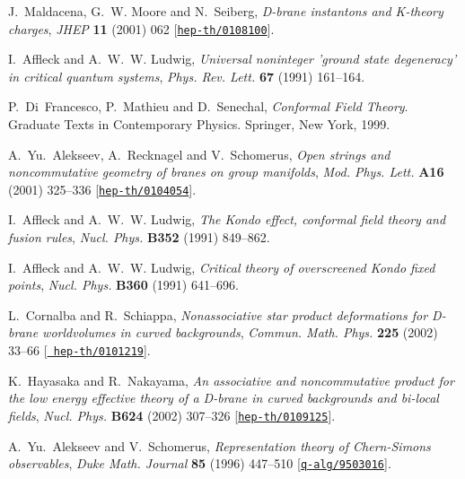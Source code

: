 \documentclass[12pt,a4paper]{article}
\begin{document}
\begin{thebibliography}{10}
J.~Maldacena, G.~W. Moore and N.~Seiberg, {\it D-brane instantons and
  {K-theory} charges},  {\em JHEP} {\bf 11} (2001) 062
  [\href{http://arXiv.org/abs/hep-th/0108100}{{\tt hep-th/0108100}}].

I.~Affleck and A.~W.~W. Ludwig, {\it Universal noninteger 'ground state
  degeneracy' in critical quantum systems},  {\em Phys. Rev. Lett.} {\bf 67}
  (1991) 161--164.

P.~Di~Francesco, P.~Mathieu and D.~Senechal, {\em {Conformal Field Theory}}.
\newblock Graduate Texts in Contemporary Physics. Springer, New York, 1999.

A.~Yu.~Alekseev, A.~Recknagel and V.~Schomerus, {\it Open strings and
  noncommutative geometry of branes on group manifolds},  {\em Mod. Phys.
  Lett.} {\bf A16} (2001) 325--336
  [\href{http://arXiv.org/abs/hep-th/0104054}{{\tt hep-th/0104054}}].

I.~Affleck and A.~W.~W. Ludwig, {\it The {Kondo} effect, conformal field theory
  and fusion rules},  {\em Nucl. Phys.} {\bf B352} (1991) 849--862.

I.~Affleck and A.~W.~W. Ludwig, {\it Critical theory of overscreened {Kondo}
  fixed points},  {\em Nucl. Phys.} {\bf B360} (1991) 641--696.

L.~Cornalba and R.~Schiappa, {\it Nonassociative star product deformations for
  {D-brane} worldvolumes in curved backgrounds},  {\em Commun. Math. Phys.}
  {\bf 225} (2002) 33--66 [\href{http://arXiv.org/abs/hep-th/0101219}{{\tt
  hep-th/0101219}}].

K.~Hayasaka and R.~Nakayama, {\it An associative and noncommutative product for
  the low energy effective theory of a {D-brane} in curved backgrounds and
  bi-local fields},  {\em Nucl. Phys.} {\bf B624} (2002) 307--326
  [\href{http://arXiv.org/abs/hep-th/0109125}{{\tt hep-th/0109125}}].

A.~Yu.~Alekseev and V.~Schomerus, {\it Representation theory of {Chern-Simons}
  observables},  {\em Duke Math. Journal} {\bf 85} (1996) 447--510
  [\href{http://arXiv.org/abs/q-alg/9503016}{{\tt q-alg/9503016}}].


\end{thebibliography}
\end{document}
